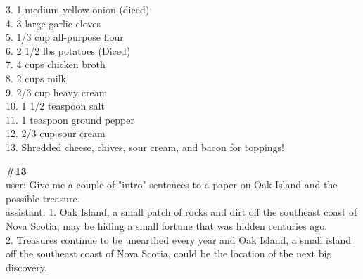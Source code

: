 \documentclass[10pt]{article}
\begin{document}
\begin{Form}
\begin{tcolorbox}[colback=convbg,colframe=itemframe,boxrule=0.8pt,arc=2pt,breakable,left=6pt,right=6pt,top=5pt,bottom=5pt]
{3. 1 medium yellow onion (diced) \\[2pt]
4. 3 large garlic cloves \\[2pt]
5. 1/3 cup all-purpose flour \\[2pt]
6. 2 1/2 lbs potatoes (Diced) \\[2pt]
7. 4 cups chicken broth \\[2pt]
8. 2 cups milk \\[2pt]
9. 2/3 cup heavy cream \\[2pt]
10. 1 1/2 teaspoon salt \\[2pt]
11. 1 teaspoon ground pepper \\[2pt]
12. 2/3 cup sour cream \\[2pt]
13. Shredded cheese, chives, sour cream, and bacon for toppings!}
\end{tcolorbox}
\vspace{-1pt}
\CheckBox[name=q12c,width=1.6ex,height=1.6ex,bordercolor={0.45 0.45 0.45}]{~\textcolor{cbox}{COMPACT}}\quad
\CheckBox[name=q12d,width=1.6ex,height=1.6ex,bordercolor={0.45 0.45 0.45}]{~\textcolor{dbox}{DIFFUSE}}\quad
\CheckBox[name=q12n,width=1.6ex,height=1.6ex,bordercolor={0.45 0.45 0.45}]{~\textcolor{nbox}{NONE}}
\vspace{8pt}
\begin{tcolorbox}[colback=convbg,colframe=itemframe,boxrule=0.8pt,arc=2pt,breakable,left=6pt,right=6pt,top=5pt,bottom=5pt]
{\footnotesize\textbf{\#13}}\\[3pt]
{\footnotesize user: Give me a couple of "intro" sentences to a paper on Oak Island and the possible treasure. \\[2pt]
assistant: 1. Oak Island, a small patch of rocks and dirt off the southeast coast of Nova Scotia, may be hiding a small fortune that was hidden centuries ago. \\[2pt]
2. Treasures continue to be unearthed every year and Oak Island, a small island off the southeast coast of Nova Scotia, could be the location of the next big discovery.}
\end{tcolorbox}
\vspace{-1pt}
\CheckBox[name=q13c,width=1.6ex,height=1.6ex,bordercolor={0.45 0.45 0.45}]{~\textcolor{cbox}{COMPACT}}\quad
\CheckBox[name=q13d,width=1.6ex,height=1.6ex,bordercolor={0.45 0.45 0.45}]{~\textcolor{dbox}{DIFFUSE}}\quad
\CheckBox[name=q13n,width=1.6ex,height=1.6ex,bordercolor={0.45 0.45 0.45}]{~\textcolor{nbox}{NONE}}
\vspace{8pt}
\begin{tcolorbox}[colback=convbg,colframe=itemframe,boxrule=0.8pt,arc=2pt,breakable,left=6pt,right=6pt,top=5pt,bottom=5pt]

\end{tcolorbox}
\end{Form}
\end{document}
